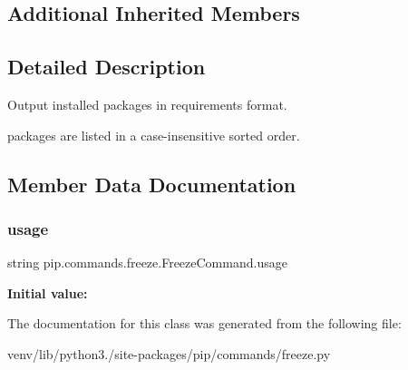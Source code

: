 \subsection*{Additional Inherited Members}


\subsection{Detailed Description}
\begin{DoxyVerb}Output installed packages in requirements format.

packages are listed in a case-insensitive sorted order.
\end{DoxyVerb}
 

\subsection{Member Data Documentation}
\mbox{\label{classpip_1_1commands_1_1freeze_1_1_freeze_command_a860519bb3303b83b15de74bd2b06ebb6}} 
\subsubsection{\texorpdfstring{usage}{usage}}
{\footnotesize\ttfamily string pip.\+commands.\+freeze.\+Freeze\+Command.\+usage\hspace{0.3cm}{\ttfamily [static]}}

{\bfseries Initial value\+:}
\begin{DoxyCode}
=  \textcolor{stringliteral}{"""}
\textcolor{stringliteral}{  %
\end{DoxyCode}


The documentation for this class was generated from the following file\+:\begin{DoxyCompactItemize}
\item 
venv/lib/python3./site-\/packages/pip/commands/freeze.\+py\end{DoxyCompactItemize}
